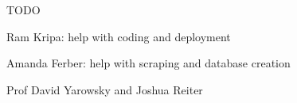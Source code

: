 
TODO

Ram Kripa: help with coding and deployment 

Amanda Ferber: help with scraping and database creation

Prof David Yarowsky and Joshua Reiter 